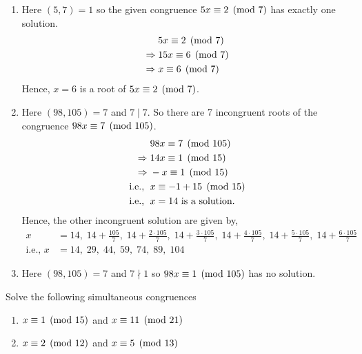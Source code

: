 \documentclass[12pt,class=book,crop=false]{standalone}
\begin{document}
\begin{soln}\hfill
    \begin{enumerate}[label=(\alph*)]
        \item Here $ (5,7)=1 $ so the given congruence $ 5x\equiv 2 \pmod{7} $ has exactly one solution.
        \begin{align*}
            &5x\equiv 2 \pmod{7}\\
            \Rightarrow\;&15x\equiv 6 \pmod{7}\\
            \Rightarrow\;&x\equiv 6 \pmod{7}
        \end{align*}
        Hence, $ x=6 $ is a root of $ 5x\equiv 2 \pmod{7} $.
        \item Here $ (98,105)=7 $ and $ 7\mid7 $. So there are 7 incongruent roots of the congruence $ 98x\equiv 7 \pmod{105} $.
        \begin{align*}
            & 98x\equiv 7 \pmod{105}\\
            \Rightarrow\;& 14x\equiv 1 \pmod{15}\\
            \Rightarrow\;& -x\equiv 1 \pmod{15}\\
            \text{i.e., }\;& x\equiv -1+15 \pmod{15}\\
            \text{i.e., }\;& x=14 \text{ is a solution.}
        \end{align*}
        Hence, the other incongruent solution are given by,
        \begin{align*}
            x&=14,\;14+\frac{105}{7},\;14+\frac{2\cdot105}{7},\;14+\frac{3\cdot105}{7},\;14+\frac{4\cdot105}{7},\;14+\frac{5\cdot105}{7},\;14+\frac{6\cdot105}{7}\\
            \text{i.e., }x&=14,\;29,\;44,\;59,\;74,\;89,\;104
        \end{align*}
        \item Here $ (98,105)=7 $ and $ 7\nmid 1 $ so $ 98x\equiv 1 \pmod{105} $ has no solution.
    \end{enumerate}
\end{soln}
\begin{qn}
    Solve the following simultaneous congruences
    \begin{enumerate}[label=(\alph*)]
        \item $ x\equiv 1 \pmod{15} $ and $ x\equiv 11 \pmod{21} $
        \item $ x\equiv 2 \pmod{12} $ and $ x\equiv 5 \pmod{13} $
    \end{enumerate}
\end{qn}
\end{document}
